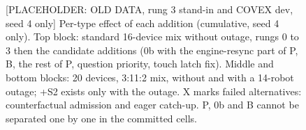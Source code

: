 \documentclass[sigconf]{acmart}
\begin{document}
{\selectfont
\begin{figure}[t]
  \centering
  
  \caption{[PLACEHOLDER: OLD DATA, rung 3 stand-in and COVEX dev, seed 4 only] Per-type effect of each addition (cumulative, seed 4 only). Top block: standard 16-device mix without outage, rungs 0 to 3 then the candidate additions (0b with the engine-resync part of P, B, the rest of P, question priority, touch latch fix). Middle and bottom blocks: 20 devices, 3:11:2 mix, without and with a 14-robot outage; +S2 exists only with the outage. X marks failed alternatives: counterfactual admission and eager catch-up. P, 0b and B cannot be separated one by one in the committed cells.}
  \label{fig:F05_ablation_ladder}
\end{figure}
}


\end{document}
